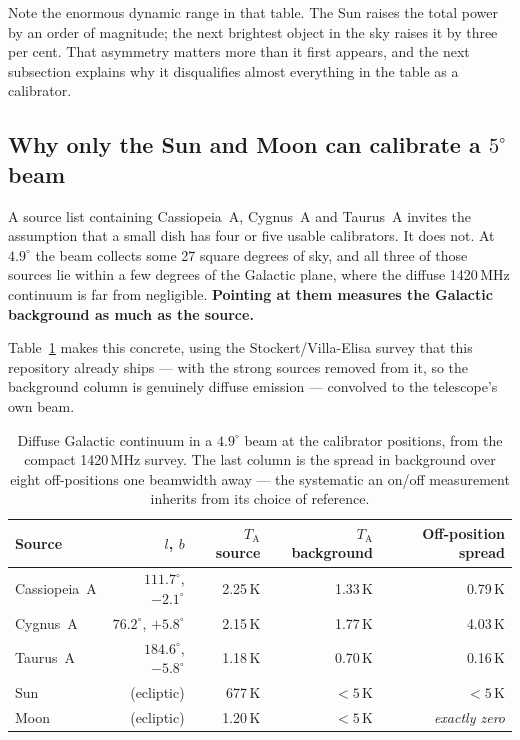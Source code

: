 \documentclass[11pt,a4paper]{article}
\begin{document}
Note the enormous dynamic range in that table. The Sun raises the total power by an order of magnitude; the next brightest object in the sky raises it by three per cent. That asymmetry matters more than it first appears, and the next subsection explains why it disqualifies almost everything in the table as a calibrator.

\subsection{Why only the Sun and Moon can calibrate a \texorpdfstring{$5^\circ$}{5 degree} beam}
\label{sec:confusion}

A source list containing Cassiopeia~A, Cygnus~A and Taurus~A invites the assumption that a small dish has four or five usable calibrators. It does not. At $4.9^\circ$ the beam collects some 27 square degrees of sky, and all three of those sources lie within a few degrees of the Galactic plane, where the diffuse 1420\,MHz continuum is far from negligible. \textbf{Pointing at them measures the Galactic background as much as the source.}

Table~\ref{tab:confusion} makes this concrete, using the Stockert/Villa-Elisa survey that this repository already ships --- with the strong sources removed from it, so the background column is genuinely diffuse emission --- convolved to the telescope's own beam.

\begin{table}[H]
\centering
\caption{Diffuse Galactic continuum in a $4.9^\circ$ beam at the calibrator positions, from the compact 1420\,MHz survey. The last column is the spread in background over eight off-positions one beamwidth away --- the systematic an on/off measurement inherits from its choice of reference.}
\label{tab:confusion}
\small
\begin{tabular}{lrrrr}
\toprule
\textbf{Source} & \textbf{$l$, $b$} & \textbf{$T_\text{A}$ source} & \textbf{$T_\text{A}$ background} & \textbf{Off-position spread} \\
\midrule
Cassiopeia~A & $111.7^\circ$, $-2.1^\circ$ & 2.25\,K & 1.33\,K & 0.79\,K \\
Cygnus~A & $76.2^\circ$, $+5.8^\circ$ & 2.15\,K & 1.77\,K & 4.03\,K \\
Taurus~A & $184.6^\circ$, $-5.8^\circ$ & 1.18\,K & 0.70\,K & 0.16\,K \\
\midrule
Sun & (ecliptic) & 677\,K & $<5$\,K & $<5$\,K \\
Moon & (ecliptic) & 1.20\,K & $<5$\,K & \emph{exactly zero} \\
\bottomrule
\end{tabular}
\end{table}
\end{document}
